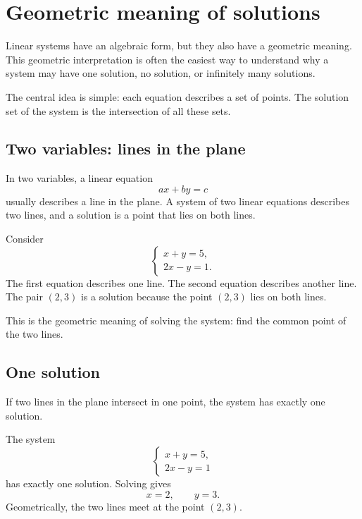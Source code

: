 \section{Geometric meaning of solutions}

Linear systems have an algebraic form, but they also have a geometric meaning. This geometric interpretation is often the easiest way to understand why a system may have one solution, no solution, or infinitely many solutions.

The central idea is simple: each equation describes a set of points. The solution set of the system is the intersection of all these sets.

\subsection*{Two variables: lines in the plane}

In two variables, a linear equation
\[
ax+by=c
\]
usually describes a line in the plane. A system of two linear equations describes two lines, and a solution is a point that lies on both lines.

\begin{examplebox}
Consider
\[
\begin{cases}
x+y=5,\\
2x-y=1.
\end{cases}
\]
The first equation describes one line. The second equation describes another line. The pair \((2,3)\) is a solution because the point \((2,3)\) lies on both lines.
\end{examplebox}

This is the geometric meaning of solving the system: find the common point of the two lines.

\subsection*{One solution}

If two lines in the plane intersect in one point, the system has exactly one solution.

\begin{examplebox}
The system
\[
\begin{cases}
x+y=5,\\
2x-y=1
\end{cases}
\]
has exactly one solution. Solving gives
\[
x=2,
\qquad
y=3.
\]
Geometrically, the two lines meet at the point \((2,3)\).
\end{examplebox}

